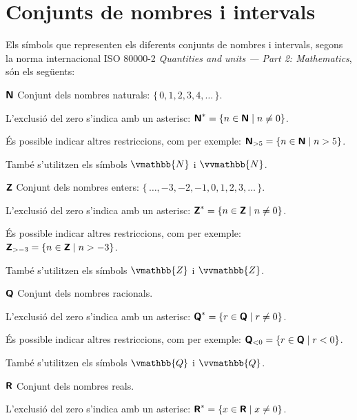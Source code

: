 \section*{Conjunts de nombres i intervals} 

Els símbols que representen els diferents conjunts de nombres i intervals, segons la norma internacional ISO 80000-2 
\textit{Quantities and units --- Part 2: Mathematics}, són els següents:

\begin{list}{}
{\setlength{\labelwidth}{15mm} \setlength{\leftmargin}{20mm}
\setlength{\labelsep}{5mm}}
	 \item[${\boldsymbol{\mathsf{N}}}$] Conjunt dels nombres naturals: $\{\,0,1,2,3,4,\ldots\,\}$. 
	 
	 L'exclusió del zero s'indica amb un asterisc: ${\boldsymbol{\mathsf{N}}}^* = \{ n \in {\ensuremath{\boldsymbol{\mathsf{N}}}} \mid n \ne 0 \}$. 
	 
	 És possible indicar altres restriccions, com per exemple:  ${\boldsymbol{\mathsf{N}}}_{> 5} = \{ n \in {\ensuremath{\boldsymbol{\mathsf{N}}}} \mid n > 5\}$. 
	 
	 També s'utilitzen els símbols $\vmathbb{N}$ i  $\vvmathbb{N}$.
	 
	 \item[${\boldsymbol{\mathsf{Z}}}$] Conjunt dels nombres enters: $\{\,\ldots,-3,-2,-1,0,1,2,3,\ldots\,\}$.  
	 
	 L'exclusió del zero s'indica amb un asterisc: ${\boldsymbol{\mathsf{Z}}}^* = \{ n \in {\ensuremath{\boldsymbol{\mathsf{Z}}}} \mid n \ne 0 \}$. 
	 
	 És possible indicar altres restriccions, com per exemple:  ${\boldsymbol{\mathsf{Z}}}_{> -3} = \{ n \in {\ensuremath{\boldsymbol{\mathsf{Z}}}} \mid n > -3\}$.     
	 
	 També s'utilitzen els símbols $\vmathbb{Z}$ i $\vvmathbb{Z}$.
    
	 \item[${\boldsymbol{\mathsf{Q}}}$] Conjunt dels nombres racionals. 
	 
	 L'exclusió del zero s'indica amb un asterisc: ${\boldsymbol{\mathsf{Q}}}^* = \{ r \in {\ensuremath{\boldsymbol{\mathsf{Q}}}} \mid r \ne 0 \}$. 
	 
	 És possible indicar altres restriccions, com per exemple:  ${\boldsymbol{\mathsf{Q}}}_{< 0} = \{ r \in {\ensuremath{\boldsymbol{\mathsf{Q}}}} \mid r < 0 \}$. 
	 
	 També s'utilitzen els símbols $\vmathbb{Q}$ i $\vvmathbb{Q}$.
	 
	 \item[${\boldsymbol{\mathsf{R}}}$] Conjunt dels nombres reals. 
	 
	 L'exclusió del zero s'indica amb un asterisc: ${\boldsymbol{\mathsf{R}}}^* = \{ x \in {\ensuremath{\boldsymbol{\mathsf{R}}}} \mid x \ne 0 \}$. 
	 

\end{list}
